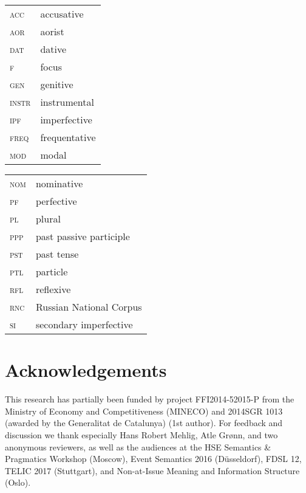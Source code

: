 \documentclass[output=paper,
modfonts,
newtxmath,
hidelinks
]{langscibook}
\begin{document}
\begin{tabularx}{.5\textwidth}{@{}lQ@{}}
\textsc{acc}&accusative\\
\textsc{aor}&aorist\\
\textsc{dat}&dative\\
\textsc{f}&focus\\
\textsc{gen}&genitive\\
\textsc{instr}&instrumental\\
\textsc{ipf}&imperfective\\
\textsc{freq}&frequentative\\
\textsc{mod}&modal\\
\end{tabularx}%
\begin{tabularx}{.5\textwidth}{@{}lQ@{}}
\textsc{nom}&nominative\\
\textsc{pf}&perfective\\
\textsc{pl}&plural\\
\textsc{ppp}&past passive participle\\
\textsc{pst}&past tense\\
\textsc{ptl}&particle\\
\textsc{rfl}&reflexive\\
\textsc{rnc}&Russian National Corpus\\
\textsc{si}&secondary imperfective\\
\end{tabularx}


\section*{Acknowledgements}

This research has partially been funded by project FFI2014-52015-P from the Ministry of Economy and Competitiveness (MINECO) and 2014SGR 1013 (awarded by the Generalitat de Catalunya) (1st author). For feedback and discussion we thank especially Hans Robert Mehlig, Atle Grønn, and  two anonymous reviewers, as well as the audiences at the HSE Semantics \& Pragmatics Workshop (Moscow), Event Semantics 2016 (D\"{u}sseldorf), FDSL 12, TELIC 2017 (Stuttgart), and Non-at-Issue Meaning and Information Structure (Oslo).

\sloppy\printbibliography[heading=subbibliography,notkeyword=this]
\end{document}
